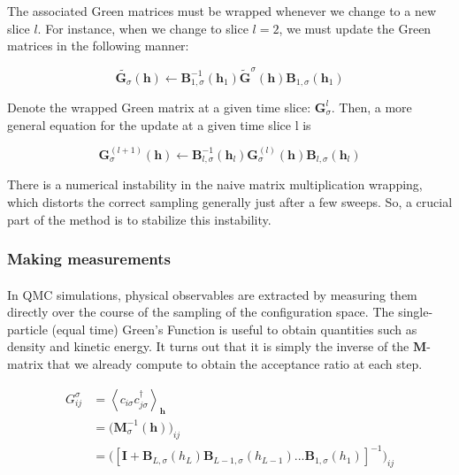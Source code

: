 \documentclass[10pt, twocolumn, twoside]{article}
\begin{document}
The associated Green matrices must be wrapped whenever we change to a new slice $l$. For instance, when we change to slice $l = 2$, we must update the Green matrices in the following manner:

\begin{equation}
\tilde{ \bm G_\sigma} ( \bm h) \leftarrow \bm B_{1, \sigma}^{-1} (\bm h_1) \tilde{\bm G}^\sigma ( \bm h) \bm B_{1, \sigma} (\bm h_1)
\end{equation}

Denote the wrapped Green matrix at a given time slice: $\bm G_\sigma^l$. Then, a more general equation for the update at a given time slice l is

\begin{equation}
 \bm G_\sigma^{(l+1)} ( \bm h) \leftarrow \bm B_{l, \sigma}^{-1} (\bm h_l) \bm G_\sigma^{(l)} ( \bm h) \bm B_{l, \sigma} (\bm h_l)
\end{equation}

There is a numerical instability in the naive matrix multiplication wrapping, which distorts the correct sampling generally just after a few sweeps. So, a crucial part of the method is to stabilize this instability.

\subsubsection{Making measurements}\paragraph{}

In QMC simulations, physical observables are extracted by measuring them directly over the course of the sampling of the  configuration space. The single-particle (equal time) Green's Function is useful to obtain quantities such as density and kinetic energy. It turns out that it is simply the inverse of the $\bm M$-matrix that we already compute to obtain the acceptance ratio at each step.

\begin{equation}
\begin{split}
G_{ij}^\sigma &= \left\langle c_{i\sigma} c_{j\sigma}^\dagger \right\rangle_{\bm h} \\
&= \bigg( \bm M_\sigma^{-1} (\bm h) \bigg)_{ij} \\
&= \bigg( [\bm I + \bm B_{L,\sigma} ( h_L ) \bm B_{L-1,\sigma} ( h_{L-1} ) ... \bm B_{1,\sigma} ( h_1 ) ]^{-1} \bigg)_{ij}
\end{split}
\end{equation}
\end{document}
